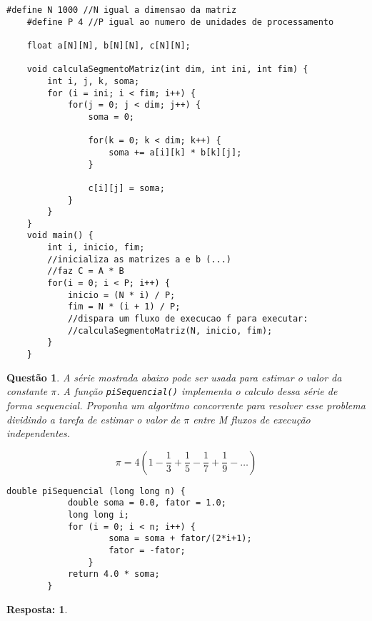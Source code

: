 \documentclass[a4paper, 12pt]{article}
\newtheorem{question}{Questão}
\theoremstyle{dotless}
\newtheorem*{answer}{\textbf{Resposta:}}
\begin{document}
\begin{lstlisting}[style=CStyle]
    #define N 1000 //N igual a dimensao da matriz
    #define P 4 //P igual ao numero de unidades de processamento

    float a[N][N], b[N][N], c[N][N];

    void calculaSegmentoMatriz(int dim, int ini, int fim) {
        int i, j, k, soma;
        for (i = ini; i < fim; i++) {
            for(j = 0; j < dim; j++) {
                soma = 0;

                for(k = 0; k < dim; k++) {
                    soma += a[i][k] * b[k][j];
                }

                c[i][j] = soma;
            }
        }
    }
    void main() {
        int i, inicio, fim;
        //inicializa as matrizes a e b (...)
        //faz C = A * B
        for(i = 0; i < P; i++) {
            inicio = (N * i) / P;
            fim = N * (i + 1) / P;
            //dispara um fluxo de execucao f para executar:
            //calculaSegmentoMatriz(N, inicio, fim);
        }
    }
\end{lstlisting}

\newpage

\begin{question}
    A série mostrada abaixo pode ser usada para estimar o valor da constante $\pi$. A função \texttt{piSequencial()} implementa o calculo dessa série de forma sequencial. Proponha um algoritmo concorrente para resolver esse problema dividindo a tarefa de estimar o valor de $\pi$ entre M fluxos de execução independentes.

    \[\pi = 4(1 - \frac{1}{3} + \frac{1}{5} - \frac{1}{7} + \frac{1}{9} - \dots)\]

    \begin{lstlisting}[style=CStyle]        
        double piSequencial (long long n) {
            double soma = 0.0, fator = 1.0;
            long long i;
            for (i = 0; i < n; i++) {
                    soma = soma + fator/(2*i+1);
                    fator = -fator;
                }
            return 4.0 * soma;
        }
    \end{lstlisting}
\end{question}
\begin{answer}
\end{answer}
\end{document}
